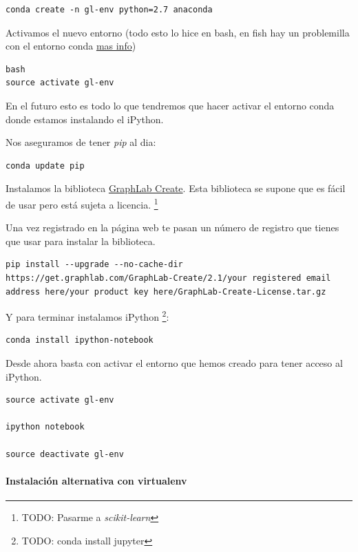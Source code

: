 \documentclass[12pt,spanish,]{article}
\let\oldparagraph\paragraph
\renewcommand{\paragraph}[1]{\oldparagraph{#1}\mbox{}}
\begin{document}
\begin{verbatim}
conda create -n gl-env python=2.7 anaconda
\end{verbatim}

Activamos el nuevo entorno (todo esto lo hice en bash, en fish hay un
problemilla con el entorno conda
\href{https://penandpants.com/2014/02/28/using-conda-environments-and-the-fish-shell/}{mas
info})

\begin{verbatim}
bash
source activate gl-env
\end{verbatim}

En el futuro esto es todo lo que tendremos que hacer activar el entorno
conda donde estamos instalando el iPython.

Nos aseguramos de tener \emph{pip} al dia:

\begin{verbatim}
conda update pip
\end{verbatim}

Instalamos la biblioteca
\href{https://turi.com/products/create/}{GraphLab Create}. Esta
biblioteca se supone que es fácil de usar pero está sujeta a licencia.
\footnote{TODO: Pasarme a \emph{scikit-learn}}

Una vez registrado en la página web te pasan un número de registro que
tienes que usar para instalar la biblioteca.

\begin{verbatim}
pip install --upgrade --no-cache-dir https://get.graphlab.com/GraphLab-Create/2.1/your registered email address here/your product key here/GraphLab-Create-License.tar.gz
\end{verbatim}

Y para terminar instalamos iPython \footnote{TODO: conda install jupyter}:

\begin{verbatim}
conda install ipython-notebook
\end{verbatim}

Desde ahora basta con activar el entorno que hemos creado para tener
acceso al iPython.

\begin{verbatim}
source activate gl-env

ipython notebook

source deactivate gl-env
\end{verbatim}

\paragraph{Instalación alternativa con
virtualenv}\label{instalaciuxf3n-alternativa-con-virtualenv}
\end{document}
